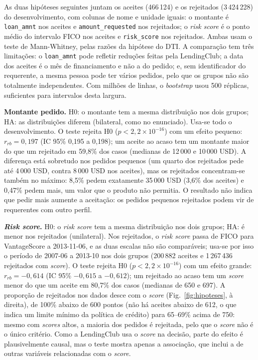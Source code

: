 As duas hipóteses seguintes juntam os aceites (466\,124) e os rejeitados (3\,424\,228) do
desenvolvimento, com colunas de nome e unidade iguais: o montante é \texttt{loan\_amnt} nos
aceites e \texttt{amount\_requested} nos rejeitados; o \textit{risk score} é o ponto médio do
intervalo FICO nos aceites e \texttt{risk\_score} nos rejeitados. Ambas usam o teste de
Mann-Whitney, pelas razões da hipótese do DTI. A comparação tem três limitações: o
\texttt{loan\_amnt} pode refletir reduções feitas pela LendingClub; a data dos aceites é o mês
de financiamento e não a do pedido; e, sem identificador do requerente, a mesma pessoa pode ter
vários pedidos, pelo que os grupos não são totalmente independentes. Com milhões de linhas, o
\textit{bootstrap} usou 500 réplicas, suficientes para intervalos desta largura.

\textbf{Montante pedido.} H0: o montante tem a mesma distribuição nos dois grupos; HA: as
distribuições diferem (bilateral, como no enunciado). Usa-se todo o desenvolvimento. O teste
rejeita H0 ($p < 2{,}2 \times 10^{-16}$) com um efeito pequeno: $r_{rb} = 0{,}197$ (IC 95\%
0,195 a 0,198); um aceite ao acaso tem um montante maior do que um rejeitado em 59,8\% dos
casos (medianas de 12\,000 e 10\,000 USD). A diferença está sobretudo nos pedidos pequenos (um
quarto dos rejeitados pede até 4\,000 USD, contra 8\,000 USD nos aceites), mas os rejeitados
concentram-se também no máximo: 8,5\% pedem exatamente 35\,000 USD (3,6\% dos aceites) e
0,47\% pedem mais, um valor que o produto não permitia. O resultado não indica que pedir mais
aumente a aceitação: os pedidos pequenos rejeitados podem vir de requerentes com outro perfil.

\textbf{\textit{Risk score}.} H0: o \textit{risk score} tem a mesma distribuição nos dois
grupos; HA: é menor nos rejeitados (unilateral). Nos rejeitados, o \textit{risk score} passa de
FICO para VantageScore a 2013-11-06, e as duas escalas não são comparáveis; usa-se por isso o
período de 2007-06 a 2013-10 nos dois grupos (200\,882 aceites e 1\,267\,436 rejeitados com
\textit{score}). O teste rejeita H0 ($p < 2{,}2 \times 10^{-16}$) com um efeito grande:
$r_{rb} = -0{,}614$ (IC 95\% $-0{,}615$ a $-0{,}612$); um rejeitado ao acaso tem um
\textit{score} menor do que um aceite em 80,7\% dos casos (medianas de 650 e 697). A proporção
de rejeitados nos dados desce com o \textit{score} (Fig.~\ref{fig:hipoteses}, à direita), de
100\% abaixo de 600 pontos (não há aceites abaixo
de 612, o que indica um limite mínimo da política de crédito) para 65--69\% acima de 750: mesmo
com \textit{scores} altos, a maioria dos pedidos é rejeitada, pelo que o \textit{score} não é o
único critério. Como a LendingClub usa o \textit{score} na decisão, parte do efeito é
plausivelmente causal, mas o teste mostra apenas a associação, que inclui a de outras variáveis
relacionadas com o \textit{score}.

